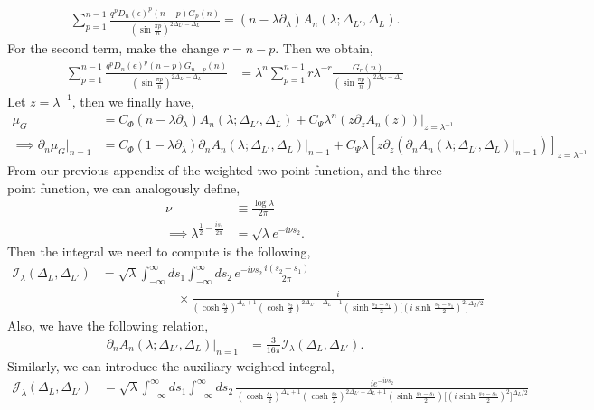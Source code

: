 \documentclass[11pt]{article}
\newcommand{\ep}{\epsilon}
\newcommand{\p}{\partial}
\newcommand{\nn}{\nonumber}
\newcommand{\lb}{\left(}
\newcommand{\rb}{\right)}
\begin{document}
\begin{align}
    \sum_{p=1}^{n-1} \frac{q^p D_n(\ep)^p(n-p)G_p(n)}{\lb\sin \frac{\pi p}{n}\rb^{2\Delta_{L'}-\Delta_L}} =\lb n-\lambda \p_\lambda\rb A_n(\lambda;\Delta_{L'},\Delta_L).
\end{align}
For the second term, make the change $r = n-p$. Then we obtain,
\begin{align}
    \sum_{p=1}^{n-1} \frac{q^p D_n(\ep)^p(n-p)G_{n-p}(n)}{\lb\sin \frac{\pi p}{n}\rb^{2\Delta_{L'}-\Delta_L}} &= \lambda^n\sum_{p=1}^{n-1} r\lambda^{-r} \frac{G_r(n)}{\lb\sin \frac{\pi p}{n}\rb^{2\Delta_{L'}-\Delta_L}}
\end{align}
Let $z = \lambda^{-1}$, then we finally have,
\begin{align}
    \mu_G &= C_\Phi\lb n-\lambda \p_\lambda\rb A_n(\lambda;\Delta_{L'},\Delta_L) + C_\Psi \lambda^n \lb z\p_z A_n(z)\rb|_{z = \lambda^{-1}} \\
    \implies \p_n \mu_G |_{n=1}&= C_\Phi(1-\lambda \p_\lambda)\p_nA_n(\lambda;\Delta_{L'},\Delta_L)|_{n=1} + C_\Psi \lambda [z\p_z \lb  \p_nA_n(\lambda;\Delta_{L'},\Delta_L)|_{n=1}\rb]_{z=\lambda^{-1}}
\end{align}
From our previous appendix of the weighted two point function, and the three point function, we can analogously define, 
\begin{align}
    \nu &\equiv \frac{\log \lambda}{2\pi} \\
    \implies  \lambda^{\frac{1}{2} - \frac{is_2}{2\pi}} &= \sqrt \lambda e^{-i\nu s_2} .
\end{align}
Then the integral we need to compute is the following,
\begin{align}
    \mathcal{I}_\lambda(\Delta_L,\Delta_{L'}) &= \sqrt \lambda \int_{-\infty}^{\infty}ds_1 \int_{-\infty}^{\infty} ds_2 \, e^{-i\nu s_2} \frac{i(s_2-s_1)}{2\pi} \nn\\
    &\qquad\qquad\qquad\times\frac{i}{\lb\cosh\frac{s_1}{2}\rb^{\Delta_L+1}\lb\cosh\frac{s_2}{2}\rb^{2\Delta_{L'}-\Delta_L+1}\lb\sinh\frac{s_2-s_1}{2}\rb\Big[\lb i\sinh\frac{s_2 - s_1}{2}\rb^2\Big]^{\Delta_L/2}}
\end{align}
Also, we have the following relation,
\begin{align}
    \p_nA_n(\lambda;\Delta_{L'},\Delta_L)|_{n=1}&=\frac{3}{16\pi}\mathcal{I}_\lambda(\Delta_L,\Delta_{L'}).
\end{align}
Similarly, we can introduce the auxiliary weighted integral,
\begin{align}
    \mathcal{J}_\lambda(\Delta_L,\Delta_{L'}) &= \sqrt \lambda \int_{-\infty}^{\infty}ds_1 \int_{-\infty}^{\infty} ds_2 \,  
    \frac{ie^{-i\nu s_2} }{\lb\cosh\frac{s_1}{2}\rb^{\Delta_L+1}\lb\cosh\frac{s_2}{2}\rb^{2\Delta_{L'}-\Delta_L+1}\lb\sinh\frac{s_2-s_1}{2}\rb\Big[\lb i\sinh\frac{s_2 - s_1}{2}\rb^2\Big]^{\Delta_L/2}}
\end{align}
\end{document}
